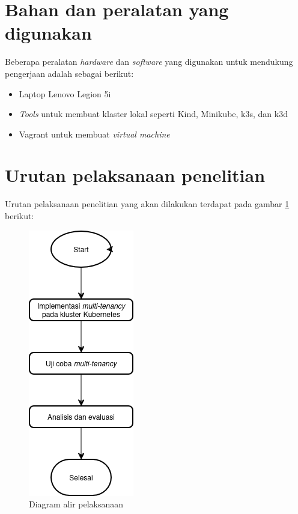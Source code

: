 \section{Bahan dan peralatan yang digunakan}

Beberapa peralatan \emph{hardware} dan \emph{software} yang digunakan untuk mendukung pengerjaan
adalah sebagai berikut:
\begin{itemize}
  \vspace{-0.3cm}\item{Laptop Lenovo Legion 5i}
  \vspace{-0.3cm}\item{\emph{Tools} untuk membuat klaster lokal seperti Kind, Minikube, k3s, dan k3d}
  \vspace{-0.3cm}\item{Vagrant untuk membuat \emph{virtual machine}}
\end{itemize}

\section{Urutan pelaksanaan penelitian}

Urutan pelaksanaan penelitian yang akan dilakukan terdapat pada gambar \ref{fig:flowchart_pelaksanaan}
berikut:

\begin{figure} [H] \centering
  \includegraphics[scale=0.7]{gambar/flowchart_pelaksanaan.png}
  \caption{Diagram alir pelaksanaan}
  \label{fig:flowchart_pelaksanaan}
\end{figure}

